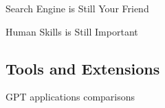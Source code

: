 \documentclass{beamer}
\begin{document}
    
      
      
      
    


\begin{frame}{Search Engine is Still Your Friend}
\end{frame}

\begin{frame}{Human Skills is Still Important}
\end{frame}

\subsection{Tools and Extensions}
\begin{frame}{GPT applications comparisons}
  
\end{frame}
\end{document}
